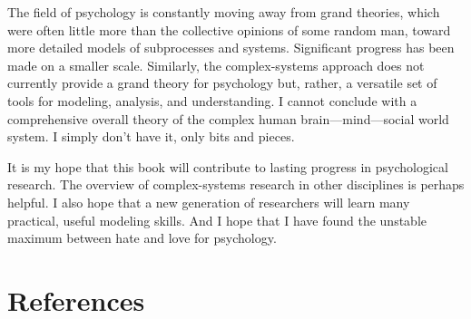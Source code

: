 \documentclass[
  a4paper,
  DIV=11,
  numbers=noendperiod,
  oneside]{scrreprt}
\begin{document}
The field of psychology is constantly moving away from grand theories,
which were often little more than the collective opinions of some random
man, toward more detailed models of subprocesses and systems.
Significant progress has been made on a smaller scale. Similarly, the
complex-systems approach does not currently provide a grand theory for
psychology but, rather, a versatile set of tools for modeling, analysis,
and understanding. I cannot conclude with a comprehensive overall theory
of the complex human brain---mind---social world system. I simply don't
have it, only bits and pieces.

It is my hope that this book will contribute to lasting progress in
psychological research. The overview of complex-systems research in
other disciplines is perhaps helpful. I also hope that a new generation
of researchers will learn many practical, useful modeling skills. And I
hope that I have found the unstable maximum between hate and love for
psychology.


\chapter*{References}\label{references}

\end{document}

